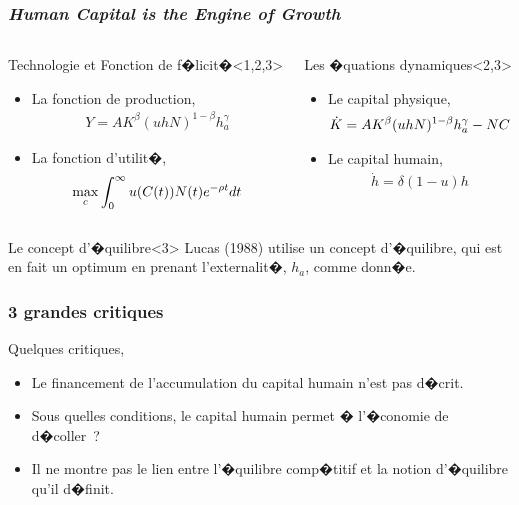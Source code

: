 \documentclass[10pt, hyperref={pdfpagemode=FullScreen}]{beamer} %
\begin{document}
\begin{frame}
     \frametitle{\emph{Human Capital is the Engine of Growth}}
     \begin{columns}
    \column{5.5cm}
\begin{block}{Technologie et Fonction de f�licit�}<1,2,3>
\begin{itemize}
\item La fonction de production,
\begin{eqnarray*}
Y = AK^{\beta} (uhN)^{1-\beta} h_{a}^{\gamma}
\end{eqnarray*}
\item La fonction d'utilit�,
\begin{eqnarray*}
\scriptsize{
\max_{c} \int_{0}^{\infty} u(C(t))  N(t) e^{-\rho t} dt
}
\end{eqnarray*}
\end{itemize}
\end{block}

\column{5.5cm}
\begin{block}{Les �quations dynamiques}<2,3>
\begin{itemize}
\item Le capital physique,
\begin{eqnarray*}
\small{
\dot{K} = AK^{\beta} (uhN)^{1-\beta}h_{a}^{\gamma} - NC 
}
\end{eqnarray*}
\item Le capital humain, 
\begin{eqnarray*}
\dot{h} = \delta (1-u)h
\end{eqnarray*}
\end{itemize}
\end{block}
\end{columns}

\begin{block}{Le concept d'�quilibre}<3>
Lucas (1988) utilise un concept d'�quilibre, qui est en fait un optimum en prenant l'externalit�, $h_{a}$, comme donn�e. 
\end{block}

\end{frame}


\begin{frame}
\transdissolve
\begin{block}{}
\end{block}
\end{frame}


\begin{frame}
     \frametitle{3 grandes critiques}
Quelques critiques,
\begin{itemize}
\item<2-| alert@2> Le financement de l'accumulation du capital humain n'est pas d�crit.
\item<3-| alert@3> Sous quelles conditions, le capital humain permet � l'�conomie de d�coller~? 
\item<4-| alert@4> Il ne montre pas le lien entre l'�quilibre comp�titif et la notion d'�quilibre qu'il d�finit.
\end{itemize}
\end{frame}
\end{document}
